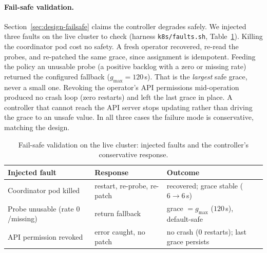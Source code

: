 \documentclass[AMA,Times1COL]{WileyNJDv5}
\begin{document}
\paragraph{Fail-safe validation.} Section~\ref{sec:design-failsafe} claims the controller degrades
safely. We injected three faults on the live cluster to check (harness \texttt{k8s/faults.sh},
Table~\ref{tab:faults}). Killing the coordinator pod cost no safety. A fresh operator recovered,
re-read the probes, and re-patched the same grace, since assignment is idempotent. Feeding the policy an
unusable probe (a positive backlog with a zero or missing rate) returned the configured fallback
($g_{\max}=120$\,s). That is the \emph{largest} safe grace, never a small one. Revoking the operator's
API permissions mid-operation produced no crash loop (zero restarts) and left the last grace in place. A
controller that cannot reach the API server stops updating rather than driving the grace to an unsafe
value. In all three cases the failure mode is conservative, matching the design.

\begin{table}[t]
\centering
\caption{Fail-safe validation on the live cluster: injected faults and the controller's
conservative response.}\label{tab:faults}
\begin{tabular}{@{}lll@{}}
\toprule
\textbf{Injected fault} & \textbf{Response} & \textbf{Outcome} \\
\midrule
Coordinator pod killed & restart, re-probe, re-patch & recovered; grace stable ($6\!\to\!6$\,s) \\
Probe unusable (rate $0$/missing) & return fallback & grace $=g_{\max}$ ($120$\,s), default-safe \\
API permission revoked & error caught, no patch & no crash ($0$ restarts); last grace persists \\
\bottomrule
\end{tabular}
\end{table}
\end{document}
